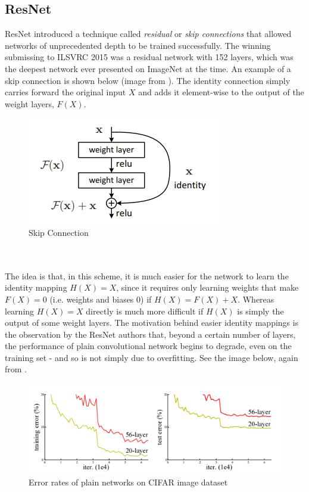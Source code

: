 \documentclass[11pt]{article} %
\theoremstyle{plain}
\theoremstyle{definition}
\begin{document}
\subsection{ResNet}
ResNet \cite{ResNet_Paper} introduced a technique called \textit{residual} or \textit{skip connections} that allowed networks of unprecedented depth to be trained successfully. The winning submissing to ILSVRC 2015 was a residual network with 152 layers, which was the deepest network ever presented on ImageNet at the time. An example of a skip connection is shown below (image from \cite{ResNet_Paper}). The identity connection simply carries forward the original input \(X\) and adds it element-wise to the output of the weight layers, \(F(X)\).
\begin{figure}[!ht]
  \centering    
  \caption{Skip Connection}
  \label{fig:Skip_Connection}
  \includegraphics[scale=0.7]{SkipConnection.PNG}
\end{figure}
\\
\\
\noindent
The idea is that, in this scheme, it is much easier for the network to learn the identity mapping \(H(X)=X\), since it requires only learning weights that make \(F(X)=0\) (i.e. weights and biases 0) if \(H(X) = F(X) + X\). Whereas learning \(H(X)=X\) directly is much more difficult if \(H(X)\) is simply the output of some weight layers. The motivation behind easier identity mappings is the observation by the ResNet authors that, beyond a certain number of layers, the performance of plain convolutional network begins to degrade, even on the training set - and so is not simply due to overfitting. See the image below, again from \cite{ResNet_Paper}.
\begin{figure}[!ht]
  \centering    
  \caption{Error rates of plain networks on CIFAR image dataset}
  \label{fig:ResNet_TrainError}
  \includegraphics[scale=0.7]{ResNet_TrainError.PNG}
\end{figure}
\end{document}
